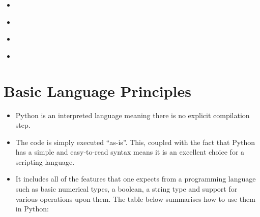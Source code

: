 \documentclass[letterpaper,10pt,english,openany]{sphinxmanual}
\begin{document}
\begin{itemize}
\item {} 
{\hyperref[\detokenize{introduction_to_python/using_modules:using-modules}]{}}

\item {} 
{\hyperref[\detokenize{introduction_to_python/pattern_matching_with_regular_expressions:pattern-matching-with-regular-expressions}]{}}

\item {} 
{\hyperref[\detokenize{introduction_to_python/basic_python_exercises_5:basic-python-exercises-5}]{}}

\item {} 
{\hyperref[\detokenize{introduction_to_python/solutions_to_exercises:solutions-to-exercises}]{}}

\end{itemize}


\section{Basic Language Principles}
\label{\detokenize{introduction_to_python/basic_language_principles:basic-language-principles}}\label{\detokenize{introduction_to_python/basic_language_principles:id1}}\label{\detokenize{introduction_to_python/basic_language_principles::doc}}\begin{itemize}
\item {} 
Python is an interpreted language meaning there is no explicit
compilation step.

\item {} 
The code is simply executed “as-is”. This, coupled with the fact that
Python has a simple and easy-to-read syntax means it is an excellent
choice for a scripting language.

\item {} 
It includes all of the features that one expects from a programming
language such as basic numerical types, a boolean, a string type and
support for various operations upon them. The table below summarises
how to use them in Python:

\end{itemize}

\begin{DUlineblock}{0em}
\item[] 
\end{DUlineblock}
\end{document}
